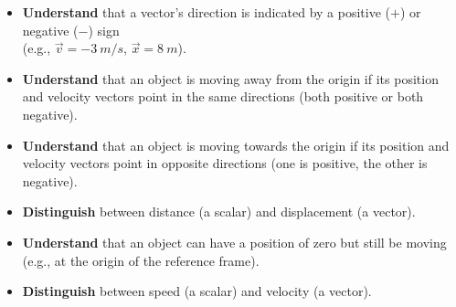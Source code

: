 \documentclass[dvipsnames]{article}
\begin{document}
\begin{itemize}[itemsep=0pt,topsep=-3pt]
    \begin{figure}[H]
    \centering
    \caption{A motion map for an object moving at constant velocity.}
    \label{C0fgZ}
    \end{figure}

    \item \textbf{Understand} that a vector's direction is indicated by a positive ($+$) or negative ($-$) sign\\(e.g., $\vec{v} = \SI{-3}{m/s}$,  $\vec{x} = \SI{8}{m}$).
    
    \item \textbf{Understand} that an object is moving away from the origin if its position and velocity vectors point in the same directions (both positive or both negative).

    \begin{center}
    \end{center}
    \item \textbf{Understand} that an object is moving towards the origin if its position and velocity vectors point in opposite directions (one is positive, the other is negative).
    \item \textbf{Distinguish} between distance (a scalar) and displacement (a vector).
    \item \textbf{Understand} that an object can have a position of zero but still be moving (e.g., at the origin of the reference frame).
    \item \textbf{Distinguish} between speed (a scalar) and velocity (a vector).
\end{itemize}
\end{document}
